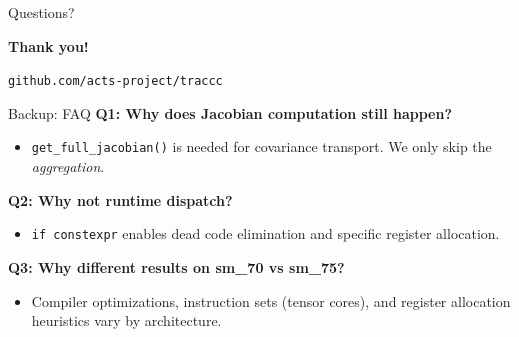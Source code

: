 \documentclass[aspectratio=169, table]{beamer}
\begin{document}
\begin{frame}{Questions?}
    \centering
    \vspace{1em}
    
    {\Huge \textcolor{acadblue}{\textbf{Thank you!}}}
    
    \vspace{2em}
    
    \vspace{2em}
    \texttt{github.com/acts-project/traccc}
\end{frame}

\appendix
\begin{frame}{Backup: FAQ}
    \textbf{Q1: Why does Jacobian computation still happen?}
    \begin{itemize}
        \item \texttt{get\_full\_jacobian()} is needed for covariance transport. We only skip the \textit{aggregation}.
    \end{itemize}

    \vspace{0.5em}
    \textbf{Q2: Why not runtime dispatch?}
    \begin{itemize}
        \item \texttt{if constexpr} enables dead code elimination and specific register allocation.
    \end{itemize}
    
    \vspace{0.5em}
    \textbf{Q3: Why different results on sm\_70 vs sm\_75?}
    \begin{itemize}
        \item Compiler optimizations, instruction sets (tensor cores), and register allocation heuristics vary by architecture.
    \end{itemize}
\end{frame}
\end{document}

